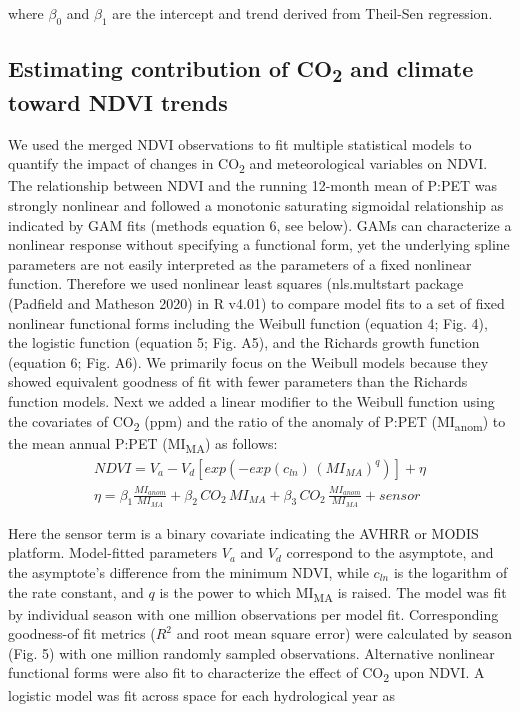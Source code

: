 \documentclass[
]{article}
\begin{document}
where \(\beta_0\) and \(\beta_1\) are the intercept and trend derived
from Theil-Sen regression.

\hypertarget{estimating-contribution-of-co2-and-climate-toward-ndvi-trends}{%
\subsection{\texorpdfstring{Estimating contribution of
CO\textsubscript{2} and climate toward NDVI
trends}{Estimating contribution of CO2 and climate toward NDVI trends}}\label{estimating-contribution-of-co2-and-climate-toward-ndvi-trends}}

We used the merged NDVI observations to fit multiple statistical models
to quantify the impact of changes in CO\textsubscript{2} and
meteorological variables on NDVI. The relationship between NDVI and the
running 12-month mean of P:PET was strongly nonlinear and followed a
monotonic saturating sigmoidal relationship as indicated by GAM fits
(methods equation 6, see below). GAMs can characterize a nonlinear
response without specifying a functional form, yet the underlying spline
parameters are not easily interpreted as the parameters of a fixed
nonlinear function. Therefore we used nonlinear least squares
(nls.multstart package (Padfield and Matheson 2020) in R v4.01) to
compare model fits to a set of fixed nonlinear functional forms
including the Weibull function (equation 4; Fig. 4), the logistic
function (equation 5; Fig. A5), and the Richards growth function
(equation 6; Fig. A6). We primarily focus on the Weibull models because
they showed equivalent goodness of fit with fewer parameters than the
Richards function models. Next we added a linear modifier to the Weibull
function using the covariates of CO\textsubscript{2} (ppm) and the ratio
of the anomaly of P:PET (MI\textsubscript{anom}) to the mean annual
P:PET (MI\textsubscript{MA}) as follows: \begin{align}
NDVI=V_a-V_d[exp(-exp(c_{ln})\,(MI_{MA})^{q})]+\eta\\
\eta = \beta_{1}\frac{MI_{anom}}{MI_{MA}}+\beta_{2}\,CO_2\,MI_{MA} +\beta_{3}\,CO_2\,\frac{MI_{anom}}{MI_{MA}}+sensor\nonumber
\end{align}

Here the sensor term is a binary covariate indicating the AVHRR or MODIS
platform. Model-fitted parameters \(V_a\) and \(V_d\) correspond to the
asymptote, and the asymptote's difference from the minimum NDVI, while
\(c_{ln}\) is the logarithm of the rate constant, and \(q\) is the power
to which MI\textsubscript{MA} is raised. The model was fit by individual
season with one million observations per model fit. Corresponding
goodness-of fit metrics (\(R^2\) and root mean square error) were
calculated by season (Fig. 5) with one million randomly sampled
observations. Alternative nonlinear functional forms were also fit to
characterize the effect of CO\textsubscript{2} upon NDVI. A logistic
model was fit across space for each hydrological year as
\end{document}
